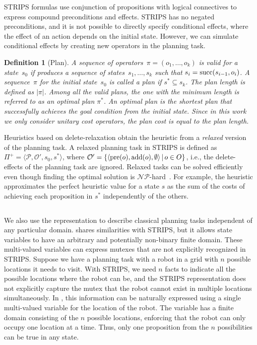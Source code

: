 \documentclass[ppgc,diss,english]{iiufrgs}
\newtheorem{definition}{Definition}
\begin{document}
STRIPS formulas use conjunction of propositions with logical connectives to express compound preconditions and effects. STRIPS has no negated preconditions, and it is not possible to directly specify conditional effects, where the effect of an action depends on the initial state. However, we can simulate conditional effects by creating new operators in the planning task.

\begin{definition}[Plan]\label{def:plan}
A sequence of operators~$\pi=(o_1,\ldots,o_k)$ is valid for a state~$s_0$ if produces a sequence of states~$s_1,\ldots,s_k$ such that $s_i=\operatorname{succ}(s_{i-1},o_i)$. A sequence~$\pi$ for the initial state~$s_{0}$ is called a plan if $s^{*} \subseteq s_{k}$. The plan length is defined as $|\pi|$. Among all the valid plans, the one with the minimum length is referred to as an optimal plan $\pi^{*}$. An optimal plan is the shortest plan that successfully achieves the goal condition from the initial state. Since in this work we only consider unitary cost operators, the plan cost is equal to the plan length.
\end{definition}

Heuristics based on delete-relaxation obtain the heuristic from a \emph{relaxed} version of the planning task. A relaxed planning task in STRIPS is defined as $\Pi^{+}=\langle\mathcal{P},\mathcal{O'},s_{0},s^{*}\rangle$, where $\mathcal{O'} = \{ \langle \operatorname{pre}(o), \operatorname{add}(o), \emptyset \rangle \,|\, o \in O \}$, i.e., the delete-effects of the planning task are ignored. Relaxed tasks can be solved efficiently even though finding the optimal solution is $\mathcal{NP}$-hard~\cite{Bylander/1994}. For example, the heuristic \hadd approximates the perfect heuristic value for a state $s$ as the sum of the costs of achieving each proposition in $s^{*}$ independently of the others.

\subsection{\sas}
\label{sec:background-sas}
We also use the \sas representation to describe classical planning tasks independent of any particular domain. \sas shares similarities with STRIPS, but it allows state variables to have an arbitrary and potentially non-binary finite domain. These multi-valued variables can express mutexes that are not explicitly recognized in STRIPS. Suppose we have a planning task with a robot in a grid with $n$ possible locations it needs to visit. With STRIPS, we need $n$ facts to indicate all the possible locations where the robot can be, and the STRIPS representation does not explicitly capture the mutex that the robot cannot exist in multiple locations simultaneously. In \sas, this information can be naturally expressed using a single multi-valued variable for the location of the robot. The variable has a finite domain consisting of the $n$ possible locations, enforcing that the robot can only occupy one location at a time. Thus, only one proposition from the $n$ possibilities can be true in any state.
\end{document}
